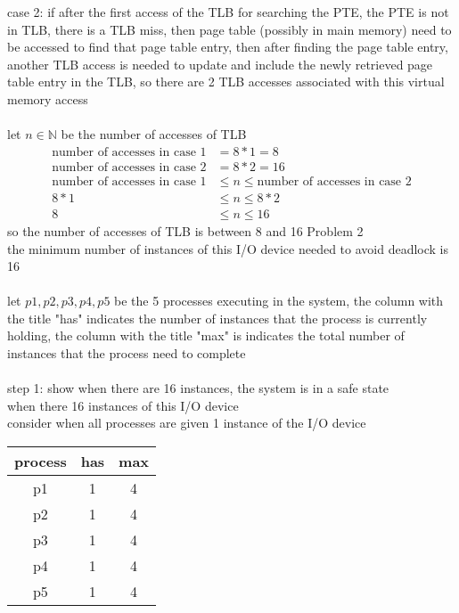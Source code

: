 \documentclass[12pt, border = 4pt, multi]{article} %
\begin{document}
case 2: if after the first access of the TLB for searching the PTE, the PTE is not in TLB, there is a TLB miss, then page table (possibly in main memory) need to be accessed to find that page table entry, then after finding the page table entry, another TLB access is needed to update and include the newly retrieved page table entry in the TLB, so there are 2 TLB accesses associated with this virtual memory access\\
\\
let $n \in \mathbb{N}$ be the number of accesses of TLB
\begin{align*}
\text{number of accesses in case 1} &= 8 * 1 = 8\\
\text{number of accesses in case 2} &= 8 * 2 = 16\\
\text{number of accesses in case 1} &\leq n \leq \text{number of accesses in case 2}\\
8 * 1 &\leq n \leq 8 * 2\\
8 &\leq n \leq 16
\end{align*}
so the number of accesses of TLB is between 8 and 16
\newpage
\noindent
Problem 2\\
the minimum number of instances of this I/O device needed to avoid deadlock is 16\\
\\
let $p1, p2, p3, p4, p5$ be the 5 processes executing in the system, the column with the title "has" indicates the number of instances that the process is currently holding, the column with the title "max" is indicates the total number of instances that the process need to complete\\
\\
step 1: show when there are 16 instances, the system is in a safe state\\
when there 16 instances of this I/O device\\
consider when all processes are given 1 instance of the I/O device
\begin{center}
\begin{tabular}{|c|c|c|}\hline
process & has & max\\\hline
p1 & 1 & 4\\\hline 
p2 & 1 & 4\\\hline  
p3 & 1 & 4\\\hline
p4 & 1 & 4\\\hline  
p5 & 1 & 4\\\hline
\end{tabular}\\
\end{center}
\end{document}
